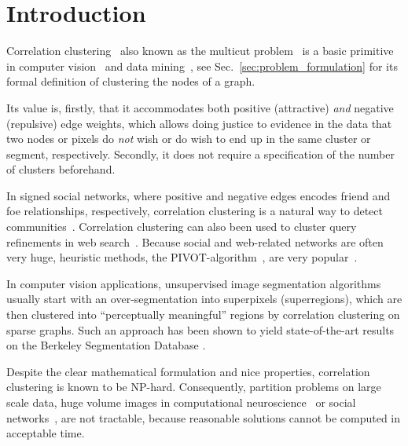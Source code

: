 \section{Introduction}
Correlation clustering~\cite{Bansal-2002} also known as the multicut problem~\cite{chopra_1993_mp} 
is a basic primitive in computer vision~\cite{andres_2011_iccv,kroeger_2012_eccv,yarkony_2012_eccv,alush_2013_simbad} and data mining~\cite{Chierichetti-2014,Arasu-2009,Sadikov-2010,Chen-2012},
see Sec.~\ref{sec:problem_formulation} for its formal definition of clustering the nodes of a graph.
 
Its value is, firstly, that it accommodates both positive (attractive) \emph{and} negative (repulsive) edge weights,
which allows doing justice to evidence in the data that two nodes or pixels do \emph{not} wish  or do wish to end up in the same cluster or segment, respectively.
Secondly, it does not require a specification of the number of clusters beforehand.


In signed social networks, where positive and negative edges encodes friend and foe relationships, respectively,
correlation clustering is a natural way to detect communities~\cite{Chierichetti-2014,Chen-2012}.
Correlation clustering can also been used to cluster query refinements in web search~\cite{Sadikov-2010}.
Because social and web-related networks are often very huge, heuristic methods, \eg the PIVOT-algorithm~\cite{Ailon-2008},
are very popular~\cite{Chierichetti-2014}.

In computer vision applications, unsupervised image segmentation algorithms usually start with an over-segmentation
into superpixels (superregions), which are then clustered into ``perceptually meaningful''
regions by correlation clustering on sparse graphs.
Such an approach has been shown to yield
state-of-the-art results on the Berkeley Segmentation Database
\cite{andres_2011_iccv,Kim-2011,yarkony_2012_eccv,alush_2013_simbad}.

Despite the clear mathematical formulation and nice properties,
correlation clustering is known to be NP-hard. 
%
Consequently, partition problems on large scale data, \eg
huge volume images in computational neuroscience~\cite{kroeger_2012_eccv}
or social networks~\cite{Leskovec-2010}, 
are not tractable, because reasonable solutions cannot be computed in acceptable time.


